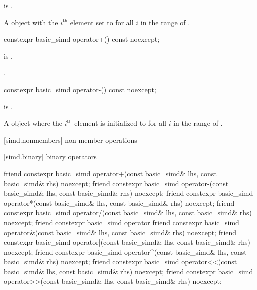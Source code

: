 \begin{itemdescr}
\pnum
\constraints
{} is .

\pnum
\returns
A  object with the $i^\text{th}$ element set to
 for all $i$ in the range of .
\end{itemdescr}

\begin{itemdecl}
constexpr basic_simd operator+() const noexcept;
\end{itemdecl}

\begin{itemdescr}
\pnum
\constraints
{} is .

\pnum
\returns
{}.
\end{itemdescr}

\begin{itemdecl}
constexpr basic_simd operator-() const noexcept;
\end{itemdecl}

\begin{itemdescr}
\pnum
\constraints
{} is .

\pnum
\returns
A  object where the $i^\text{th}$ element is initialized to
 for all $i$ in the range of .
\end{itemdescr}

[simd.nonmembers]{ non-member operations}

[simd.binary]{ binary operators}

\begin{itemdecl}
friend constexpr basic_simd operator+(const basic_simd& lhs, const basic_simd& rhs) noexcept;
friend constexpr basic_simd operator-(const basic_simd& lhs, const basic_simd& rhs) noexcept;
friend constexpr basic_simd operator*(const basic_simd& lhs, const basic_simd& rhs) noexcept;
friend constexpr basic_simd operator/(const basic_simd& lhs, const basic_simd& rhs) noexcept;
friend constexpr basic_simd operator%
friend constexpr basic_simd operator&(const basic_simd& lhs, const basic_simd& rhs) noexcept;
friend constexpr basic_simd operator|(const basic_simd& lhs, const basic_simd& rhs) noexcept;
friend constexpr basic_simd operator^(const basic_simd& lhs, const basic_simd& rhs) noexcept;
friend constexpr basic_simd operator<<(const basic_simd& lhs, const basic_simd& rhs) noexcept;
friend constexpr basic_simd operator>>(const basic_simd& lhs, const basic_simd& rhs) noexcept;
\end{itemdecl}

